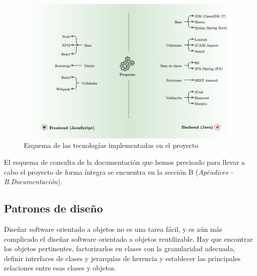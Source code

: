 \documentclass[../ei103948-project-documentation.tex]{subfiles}
\begin{document}
				\begin{figure}[H]
					\begin{center}
					\includegraphics[scale=0.15]{images/FrontBackEnd.png}
					\end{center}
					\caption{Esquema de las tecnologías implementadas en el proyecto}
				\end{figure}

				El esquema de consulta de la documentación que hemos precisado para llevar a cabo el proyecto de forma íntegra se encuentra en la sección B (\textit{Apéndices - B.Documentación}).

                \subsection{Patrones de diseño}
    
                Diseñar software orientado a objetos no es una tarea fácil, y es aún más complicado el diseñar software orientado a objetos reutilizable. Hay que encontrar los objetos pertinentes, factorizarlos en clases con la granularidad adecuada, definir interfaces de clases y jerarquías de herencia y establecer las principales relaciones entre esas clases y objetos.\\
            
\end{document}
